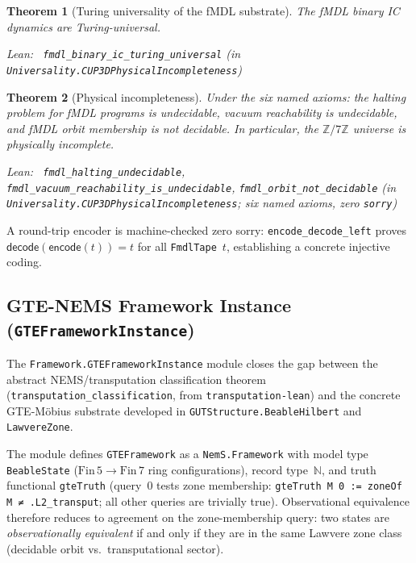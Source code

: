 \documentclass[11pt,a4paper]{article}
\newenvironment{leanref}%
  {\par\smallskip\noindent\begingroup\raggedright\textup{Lean:}~}%
  {\par\endgroup}
\newtheorem{theorem}{Theorem}[section]
\theoremstyle{definition}
\begin{document}
\begin{theorem}[Turing universality of the fMDL substrate]\label{thm:fmdl-turing}
The fMDL binary IC dynamics are Turing-universal.

\begin{leanref}
\lstinline|fmdl_binary_ic_turing_universal|
\textup{(in \texttt{Universality.CUP3DPhysicalIncompleteness})}
\end{leanref}
\end{theorem}

\begin{theorem}[Physical incompleteness]\label{thm:physical-incompleteness}
Under the six named axioms: the halting problem for fMDL programs is undecidable,
vacuum reachability is undecidable, and fMDL orbit membership is not decidable.
In particular, the $\mathbb{Z}/7\mathbb{Z}$ universe is physically incomplete.

\begin{leanref}
\lstinline|fmdl_halting_undecidable|,
\lstinline|fmdl_vacuum_reachability_is_undecidable|,
\lstinline|fmdl_orbit_not_decidable|
\textup{(in \texttt{Universality.CUP3DPhysicalIncompleteness};
six named axioms, zero \texttt{sorry})}
\end{leanref}
\end{theorem}

A round-trip encoder is machine-checked zero sorry:
\lstinline|encode_decode_left| proves $\mathsf{decode}(\mathsf{encode}(t)) = t$
for all \texttt{FmdlTape}~$t$, establishing a concrete injective coding.

\subsection[GTE-NEMS Framework Instance]{GTE-NEMS Framework Instance (\texttt{GTEFrameworkInstance})}\label{subsec:gte-framework-instance}

The \texttt{Framework.GTEFrameworkInstance} module closes the gap between the
abstract NEMS/transputation classification theorem (\texttt{transputation\_classification},
from \texttt{transputation-lean}) and the concrete GTE-Möbius substrate developed in
\texttt{GUTStructure.BeableHilbert} and \texttt{LawvereZone}.

The module defines \lstinline|GTEFramework| as a \texttt{NemS.Framework} with
model type \lstinline|BeableState| ($\mathrm{Fin}\,5 \to \mathrm{Fin}\,7$ ring
configurations), record type~$\mathbb{N}$, and truth functional \lstinline|gteTruth|
(query~$0$ tests zone membership: \lstinline|gteTruth M 0 := zoneOf M ≠ .L2_transput|;
all other queries are trivially true).
Observational equivalence therefore reduces to agreement on the zone-membership
query: two states are \emph{observationally equivalent} if and only if they are
in the same Lawvere zone class (decidable orbit vs.\ transputational sector).
\end{document}
